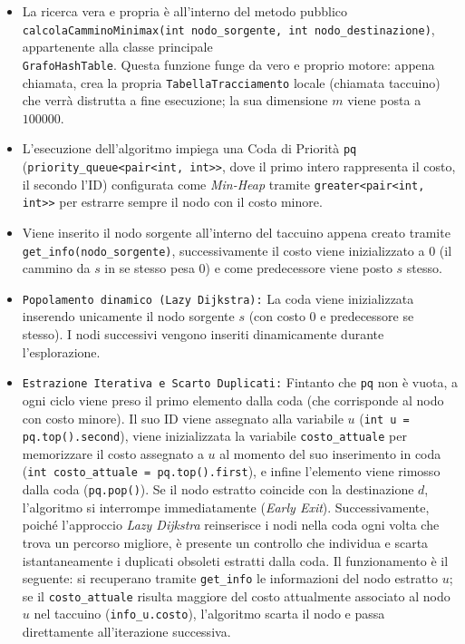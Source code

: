 \documentclass[12pt, a4paper]{article}
\begin{document}
\begin{enumerate}
\begin{itemize}
        \item[-] La ricerca vera e propria è all'interno del metodo pubblico \texttt{calcolaCamminoMinimax(int nodo\_sorgente, int nodo\_destinazione)}, appartenente alla classe principale \\ \texttt{GrafoHashTable}. Questa funzione funge da vero e proprio motore: appena chiamata, crea la propria \texttt{TabellaTracciamento} locale (chiamata taccuino) che verrà distrutta a fine esecuzione; la sua dimensione $m$ viene posta a $100000$.
        \item[-] L'esecuzione dell'algoritmo impiega una Coda di Priorità \texttt{pq} (\texttt{priority\_queue<pair<int, int>>}, dove il primo intero rappresenta il costo, il secondo l'ID) configurata come \textit{Min-Heap} tramite \texttt{greater<pair<int, int>>} per estrarre sempre il nodo con il costo minore.
        \item[-] Viene inserito il nodo sorgente all'interno del taccuino appena creato tramite \\ \texttt{get\_info(nodo\_sorgente)}, successivamente il costo viene inizializzato a $0$ (il cammino da $s$ in se stesso pesa $0$) e come predecessore viene posto $s$ stesso.
        \item[-] \texttt{Popolamento dinamico (Lazy Dijkstra):} La coda viene inizializzata inserendo unicamente il nodo sorgente $s$ (con costo 0 e predecessore se stesso). I nodi successivi vengono inseriti dinamicamente durante l'esplorazione. 
        \item[-] \texttt{Estrazione Iterativa e Scarto Duplicati:} Fintanto che \texttt{pq} non è vuota, a ogni ciclo viene preso il primo elemento dalla coda (che corrisponde al nodo con costo minore). Il suo ID viene assegnato alla variabile $u$ (\texttt{int u = pq.top().second}), viene inizializzata la variabile \texttt{costo\_attuale} per memorizzare il costo assegnato a $u$ al momento del suo inserimento in coda (\texttt{int costo\_attuale = pq.top().first}), e infine l'elemento viene rimosso dalla coda (\texttt{pq.pop()}). Se il nodo estratto coincide con la destinazione $d$, l'algoritmo si interrompe immediatamente (\textit{Early Exit}). Successivamente, poiché l'approccio \textit{Lazy Dijkstra} reinserisce i nodi nella coda ogni volta che trova un percorso migliore, è presente un controllo che individua e scarta istantaneamente i duplicati obsoleti estratti dalla coda. Il funzionamento è il seguente: si recuperano tramite \texttt{get\_info} le informazioni del nodo estratto $u$; se il \texttt{costo\_attuale} risulta maggiore del costo attualmente associato al nodo $u$ nel taccuino (\texttt{info\_u.costo}), l'algoritmo scarta il nodo e passa direttamente all'iterazione successiva.

\end{itemize}
\end{enumerate}
\end{document}

